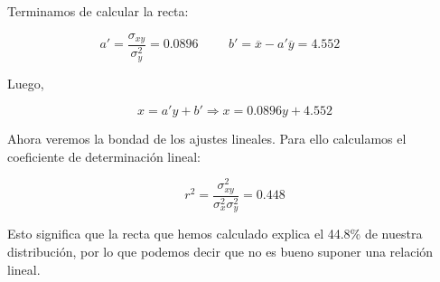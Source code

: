Terminamos de calcular la recta:

\begin{equation*}
    a' = \dfrac{\sigma_{xy}}{\sigma_y^2} = 0.0896
    \hspace{1cm}
    b' = \overline{x} - a' \overline{y} = 4.552
    \hspace{1cm}
\end{equation*}

Luego,

\begin{equation*}
    x = a'y + b' \Rightarrow x = 0.0896y + 4.552
\end{equation*}

Ahora veremos la bondad de los ajustes lineales. Para ello calculamos el coeficiente de determinación lineal:

\begin{equation*}
    r^2 = \dfrac{\sigma_{xy}^2}{\sigma_x^2 \sigma_y^2} = 0.448
\end{equation*}

Esto significa que la recta que hemos calculado explica el 44.8\% de nuestra distribución, por lo que podemos decir que no es bueno suponer una relación lineal.
